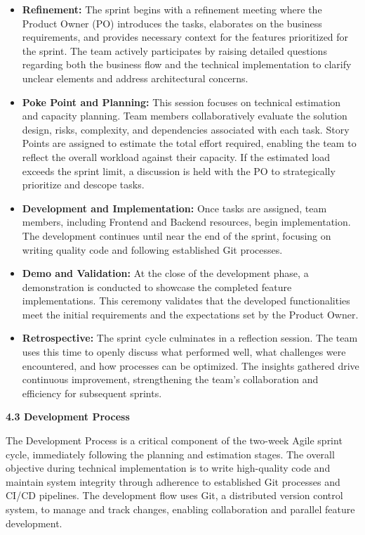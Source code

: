 \begin{itemize}
\item
  \textbf{Refinement:} The sprint begins with a refinement meeting where
  the Product Owner (PO) introduces the tasks, elaborates on the
  business requirements, and provides necessary context for the features
  prioritized for the sprint. The team actively participates by raising
  detailed questions regarding both the business flow and the technical
  implementation to clarify unclear elements and address architectural
  concerns.
\item
  \textbf{Poke Point and Planning:} This session focuses on technical
  estimation and capacity planning. Team members collaboratively
  evaluate the solution design, risks, complexity, and dependencies
  associated with each task. Story Points are assigned to estimate the
  total effort required, enabling the team to reflect the overall
  workload against their capacity. If the estimated load exceeds the
  sprint limit, a discussion is held with the PO to strategically
  prioritize and descope tasks.
\item
  \textbf{Development and Implementation:} Once tasks are assigned, team
  members, including Frontend and Backend resources, begin
  implementation. The development continues until near the end of the
  sprint, focusing on writing quality code and following established Git
  processes.
\item
  \textbf{Demo and Validation:} At the close of the development phase, a
  demonstration is conducted to showcase the completed feature
  implementations. This ceremony validates that the developed
  functionalities meet the initial requirements and the expectations set
  by the Product Owner.
\item
  \textbf{Retrospective:} The sprint cycle culminates in a reflection
  session. The team uses this time to openly discuss what performed
  well, what challenges were encountered, and how processes can be
  optimized. The insights gathered drive continuous improvement,
  strengthening the team's collaboration and efficiency for subsequent
  sprints.
\end{itemize}

\textbf{4.3 Development Process}

The Development Process is a critical component of the two-week Agile
sprint cycle, immediately following the planning and estimation stages.
The overall objective during technical implementation is to write
high-quality code and maintain system integrity through adherence to
established Git processes and CI/CD pipelines. The development flow uses
Git, a distributed version control system, to manage and track changes,
enabling collaboration and parallel feature development.

